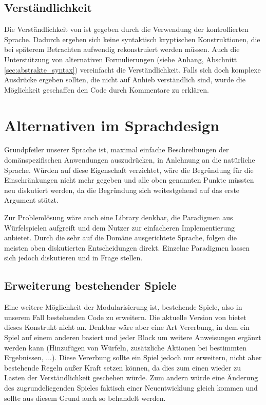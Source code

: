 	\subsection{Verständlichkeit}
	\label{sub:verstandlichkeit}
		Die Verständlichkeit von \dg ist gegeben durch die Verwendung der kontrollierten Sprache. Dadurch ergeben sich keine syntaktisch kryptischen Konstruktionen, die bei späterem Betrachten aufwendig rekonstruiert werden müssen. Auch die Unterstützung von alternativen Formulierungen (siehe Anhang, Abschnitt \ref{sec:abstrakte_syntax}) vereinfacht die Verständlichkeit. Falls sich doch komplexe Ausdrücke ergeben sollten, die nicht auf Anhieb verständlich sind, wurde die Möglichkeit geschaffen den Code durch Kommentare zu erklären.

\section{Alternativen im Sprachdesign}
\label{sec:alternativen_im_sprachdesign} 
	Grundpfeiler unserer Sprache ist, maximal einfache Beschreibungen der domänspezifischen Anwendungen auszudrücken, in Anlehnung an die natürliche Sprache. Würden auf diese Eigenschaft verzichtet, wäre die Begründung für die Einschränkungen nicht mehr gegeben und alle oben genannten Punkte müssten neu diskutiert werden, da die Begründung sich weitestgehend auf das erste Argument stützt. 

	Zur Problemlösung wäre auch eine Library denkbar, die Paradigmen aus Würfelspielen aufgreift und dem Nutzer zur einfacheren Implementierung anbietet. Durch die sehr auf die Domäne ausgerichtete Sprache, folgen die meisten oben diskutierten Entscheidungen direkt. Einzelne Paradigmen lassen sich jedoch diskutieren und in Frage stellen.

	\subsection{Erweiterung bestehender Spiele}
	\label{sub:erweiterung_bestehender_spiele}
		Eine weitere Möglichkeit der Modularisierung ist, bestehende Spiele, also in unserem Fall bestehenden Code zu erweitern. Die aktuelle Version von \dg bietet dieses Konstrukt nicht an. Denkbar wäre aber eine Art Vererbung, in dem ein Spiel auf einem anderen basiert und jeder Block um weitere Anweisungen ergänzt werden kann (Hinzufügen von Würfeln, zusätzliche Aktionen bei bestimmten Ergebnissen, ...). Diese Vererbung sollte ein Spiel jedoch nur erweitern, nicht aber bestehende Regeln außer Kraft setzen können, da dies zum einen wieder zu Lasten der Verständlichkeit geschehen würde. Zum andern würde eine Änderung des zugrundeliegenden Spieles faktisch einer Neuentwicklung gleich kommen und sollte aus diesem Grund auch so behandelt werden.

